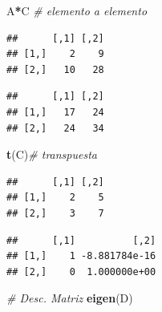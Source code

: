 \documentclass[
]{book}
\newenvironment{Shaded}{\begin{snugshade}}{\end{snugshade}}
\newcommand{\CommentTok}[1]{\textcolor[rgb]{0.56,0.35,0.01}{\textit{#1}}}
\newcommand{\KeywordTok}[1]{\textcolor[rgb]{0.13,0.29,0.53}{\textbf{#1}}}
\newcommand{\NormalTok}[1]{#1}
\newcommand{\OperatorTok}[1]{\textcolor[rgb]{0.81,0.36,0.00}{\textbf{#1}}}
\newcommand{\StringTok}[1]{\textcolor[rgb]{0.31,0.60,0.02}{#1}}
\begin{document}
\begin{Shaded}
\begin{Highlighting}[]
\NormalTok{A}\OperatorTok{*}\NormalTok{C }\CommentTok{# elemento a elemento}
\end{Highlighting}
\end{Shaded}

\begin{verbatim}
##      [,1] [,2]
## [1,]    2    9
## [2,]   10   28
\end{verbatim}

\begin{Shaded}
\end{Shaded}

\begin{verbatim}
##      [,1] [,2]
## [1,]   17   24
## [2,]   24   34
\end{verbatim}

\begin{Shaded}
\begin{Highlighting}[]
\KeywordTok{t}\NormalTok{(C)}\CommentTok{# transpuesta}
\end{Highlighting}
\end{Shaded}

\begin{verbatim}
##      [,1] [,2]
## [1,]    2    5
## [2,]    3    7
\end{verbatim}

\begin{Shaded}
\end{Shaded}

\begin{verbatim}
##      [,1]          [,2]
## [1,]    1 -8.881784e-16
## [2,]    0  1.000000e+00
\end{verbatim}

\begin{Shaded}
\begin{Highlighting}[]
\CommentTok{# Desc. Matriz}
\KeywordTok{eigen}\NormalTok{(D)}
\end{Highlighting}
\end{Shaded}
\end{document}
